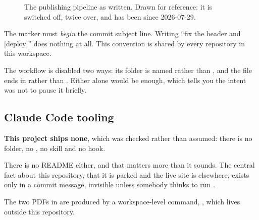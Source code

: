 \documentclass[11pt,a4paper]{article}
\begin{document}
\begin{figure}[H]\centering
{}
\caption{The publishing pipeline as written. Drawn for reference: it is switched
off, twice over, and has been since 2026-07-29.}
\end{figure}

The \code{[deploy]} marker must \emph{begin} the commit subject line. Writing
``fix the header and [deploy]'' does nothing at all. This convention is shared by
every repository in this workspace.

The workflow is disabled two ways: its folder is named
 rather than , and the
file ends in  rather than . Either alone would be
enough, which tells you the intent was not to pause it briefly.

\subsection{Claude Code tooling}

\textbf{This project ships none}, which was checked rather than assumed: there is
no  folder, no , no skill and no hook.

There is no README either, and that matters more than it sounds. The central fact
about this repository, that it is parked and the live site is elsewhere, exists
only in a commit message, invisible unless somebody thinks to run .

The two PDFs in  are produced by a workspace-level command,
, which lives outside this repository.

\end{document}
